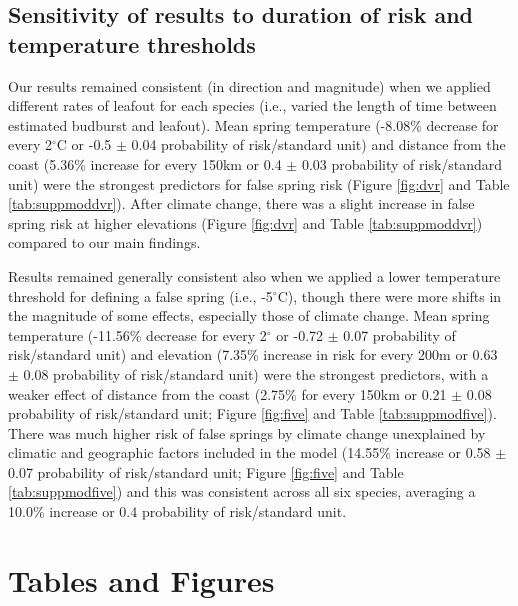 \documentclass{article}\usepackage[]{graphicx}\usepackage[]{color}
\begin{document}

\subsection*{Sensitivity of results to duration of risk and temperature thresholds}
Our results remained consistent (in direction and magnitude) when we applied different rates of leafout for each species (i.e., varied the length of time between estimated budburst and leafout). Mean spring temperature (-8.08\% decrease for every 2$^\circ$C or -0.5 $\pm$ 0.04 probability of risk/standard unit) and distance from the coast (5.36\% increase for every 150km or 0.4 $\pm$ 0.03 probability of risk/standard unit) were the strongest predictors for false spring risk (Figure \ref{fig:dvr} and Table \ref{tab:suppmoddvr}). After climate change, there was a slight increase in false spring risk at higher elevations (Figure \ref{fig:dvr} and Table \ref{tab:suppmoddvr}) compared to our main findings. 

Results remained generally consistent also when we applied a lower temperature threshold for defining a false spring (i.e., -5$^{\circ}$C), though there were more shifts in the magnitude of some effects, especially those of climate change. Mean spring temperature (-11.56\% decrease for every 2$^\circ$ or -0.72 $\pm$ 0.07 probability of risk/standard unit) and elevation (7.35\% increase in risk for every 200m or 0.63 $\pm$ 0.08 probability of risk/standard unit) were the strongest predictors, with a weaker effect of distance from the coast (2.75\% for every 150km or 0.21 $\pm$ 0.08 probability of risk/standard unit; Figure \ref{fig:five} and Table \ref{tab:suppmodfive}). There was much higher risk of false springs by climate change unexplained by climatic and geographic factors included in the model (14.55\% increase or 0.58 $\pm$ 0.07 probability of risk/standard unit; Figure \ref{fig:five} and Table \ref{tab:suppmodfive}) and this was consistent across all six species, averaging a 10.0\% increase or 0.4 probability of risk/standard unit. 



\section*{Tables and Figures} 
\end{document}
